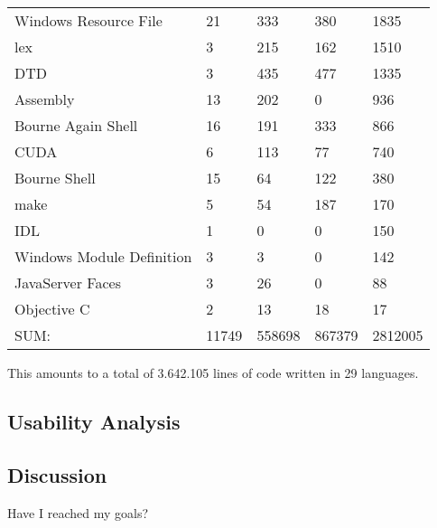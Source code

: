 \begin{table}[h]
\begin{tabular}{ l|l|l|l|l }
		Windows Resource File                 &  21         &   333         &   380        &   1835\\
		lex                                   &   3         &   215         &   162        &   1510\\
		DTD                                   &   3         &   435         &   477        &   1335\\
		Assembly                              &  13         &   202         &     0        &    936\\
		Bourne Again Shell                    &  16         &   191         &   333        &    866\\
		CUDA                                  &   6         &   113         &    77        &    740\\
		Bourne Shell                          &  15         &    64         &   122        &    380\\
		make                                  &   5         &    54         &   187        &    170\\
		IDL                                   &   1         &     0         &     0        &    150\\
		Windows Module Definition             &   3         &     3         &     0        &    142\\
		JavaServer Faces                      &   3         &    26         &     0        &     88\\
		Objective C                           &   2         &    13         &    18        &     17\\
		\hline
		SUM:                                 &11749         &558698         &867379        &2812005\\
		\hline
	\end{tabular}
    \normalfont
    \label{table:VTKStatistic}
\end{table}
This amounts to a total of 3.642.105 lines of code written in 29 languages.
\subsection{Usability Analysis}



\subsection{Discussion}
Have I reached my goals?